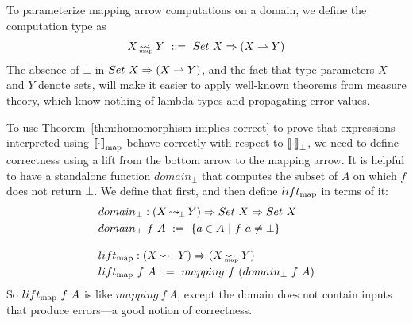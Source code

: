 To parameterize mapping arrow computations on a domain, we define the  computation type as
\begin{equation}
	X \mapto Y \ ::= \ Set~X \tto (X \pto Y)
\end{equation}
The absence of $\bot$ in $Set~X \Rightarrow (X \rightharpoonup Y)$, and the fact that type parameters $X$ and $Y$ denote sets, will make it easier to apply well-known theorems from measure theory, which know nothing of lambda types and propagating error values.

To use Theorem~\ref{thm:homomorphism-implies-correct} to prove that expressions interpreted using $\left\llbracket{\cdot}\right\rrbracket_\mathrm{map}$ behave correctly with respect to $\left\llbracket{\cdot}\right\rrbracket_\bot$, we need to define correctness using a lift from the bottom arrow to the mapping arrow.
It is helpful to have a standalone function $domain_\bot$ that computes the subset of $A$ on which $f$ does not return $\bot$.
We define that first, and then define $lift_\mathrm{map}$ in terms of it:
\begin{align}
	&\begin{aligned}
		&domain_\bot : (X \operatorname{\rightsquigarrow_{\mspace{-3mu}\bot}} Y) \Rightarrow Set~X \Rightarrow Set~X \\
		&domain_\bot~f~A \ := \ \lbrace {a \in A} \ \lvert\ {f~a \neq \bot} \rbrace
	\end{aligned} \\
\nonumber\\[-0.5\baselineskip]
	&\begin{aligned}
		&lift_\mathrm{map} : (X \operatorname{\rightsquigarrow_{\mspace{-3mu}\bot}} Y) \Rightarrow (X \operatorname{\rightsquigarrow_{\mspace{-23mu}_\mathrm{map}}} Y) \\
		&lift_\mathrm{map}~f~A \ := \ mapping~f~(domain_\bot~f~A)
	\end{aligned}
\end{align}
So $lift_\mathrm{map}~f~A$ is like $mapping~f~A$, except the domain does not contain inputs that produce errors---a good notion of correctness.

